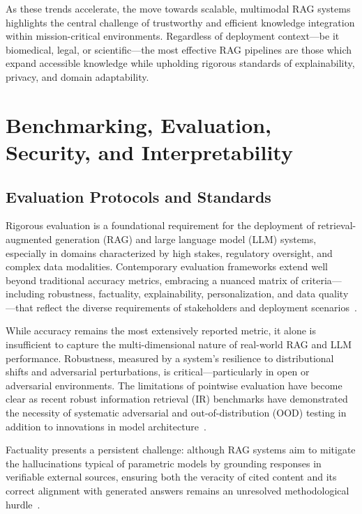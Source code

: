 As these trends accelerate, the move towards scalable, multimodal RAG systems highlights the central challenge of trustworthy and efficient knowledge integration within mission-critical environments. Regardless of deployment context—be it biomedical, legal, or scientific—the most effective RAG pipelines are those which expand accessible knowledge while upholding rigorous standards of explainability, privacy, and domain adaptability.

\section{Benchmarking, Evaluation, Security, and Interpretability}

\subsection{Evaluation Protocols and Standards}

Rigorous evaluation is a foundational requirement for the deployment of retrieval-augmented generation (RAG) and large language model (LLM) systems, especially in domains characterized by high stakes, regulatory oversight, and complex data modalities. Contemporary evaluation frameworks extend well beyond traditional accuracy metrics, embracing a nuanced matrix of criteria—including robustness, factuality, explainability, personalization, and data quality—that reflect the diverse requirements of stakeholders and deployment scenarios~\cite{ref2,ref3,ref5,ref8,ref10,ref21,ref22,ref25,ref26,ref28,ref29,ref30,ref32,ref33,ref34,ref36,ref37,ref38,ref39,ref40,ref42,ref43,ref46,ref47,ref49,ref50,ref51,ref52,ref53,ref54,ref55,ref61,ref62}.

While accuracy remains the most extensively reported metric, it alone is insufficient to capture the multi-dimensional nature of real-world RAG and LLM performance. Robustness, measured by a system’s resilience to distributional shifts and adversarial perturbations, is critical—particularly in open or adversarial environments. The limitations of pointwise evaluation have become clear as recent robust information retrieval (IR) benchmarks have demonstrated the necessity of systematic adversarial and out-of-distribution (OOD) testing in addition to innovations in model architecture~\cite{ref49,ref50,ref54,ref61}. 

Factuality presents a persistent challenge: although RAG systems aim to mitigate the hallucinations typical of parametric models by grounding responses in verifiable external sources, ensuring both the veracity of cited content and its correct alignment with generated answers remains an unresolved methodological hurdle~\cite{ref32,ref33,ref34,ref36,ref37,ref49,ref51,ref52,ref53,ref54,ref55,ref61,ref62,ref63,ref64}. 

